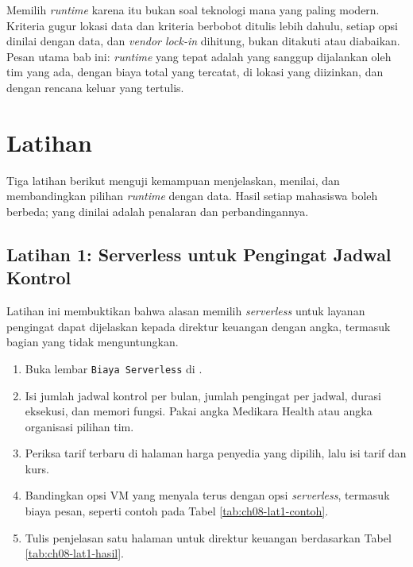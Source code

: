 Memilih \textit{runtime} karena itu bukan soal teknologi mana yang paling modern. Kriteria gugur
lokasi data dan kriteria berbobot ditulis lebih dahulu, setiap opsi dinilai dengan data, dan
\textit{vendor lock-in} dihitung, bukan ditakuti atau diabaikan. Pesan utama bab ini:
\textit{runtime} yang tepat adalah yang sanggup dijalankan oleh tim yang ada, dengan biaya total
yang tercatat, di lokasi yang diizinkan, dan dengan rencana keluar yang tertulis.

\section{Latihan}

Tiga latihan berikut menguji kemampuan menjelaskan, menilai, dan membandingkan pilihan
\textit{runtime} dengan data. Hasil setiap mahasiswa boleh berbeda; yang dinilai adalah penalaran
dan perbandingannya.

\subsection*{Latihan 1: Serverless untuk Pengingat Jadwal Kontrol}

Latihan ini membuktikan bahwa alasan memilih \textit{serverless} untuk layanan pengingat dapat
dijelaskan kepada direktur keuangan dengan angka, termasuk bagian yang tidak menguntungkan.

\begin{enumerate}
  \item Buka lembar \texttt{Biaya Serverless} di
        .
  \item Isi jumlah jadwal kontrol per bulan, jumlah pengingat per jadwal, durasi eksekusi, dan
        memori fungsi. Pakai angka Medikara Health atau angka organisasi pilihan tim.
  \item Periksa tarif terbaru di halaman harga penyedia yang dipilih, lalu isi tarif dan kurs.
  \item Bandingkan opsi VM yang menyala terus dengan opsi \textit{serverless}, termasuk biaya pesan,
        seperti contoh pada Tabel \ref{tab:ch08-lat1-contoh}.
  \item Tulis penjelasan satu halaman untuk direktur keuangan berdasarkan Tabel
        \ref{tab:ch08-lat1-hasil}.
\end{enumerate}

